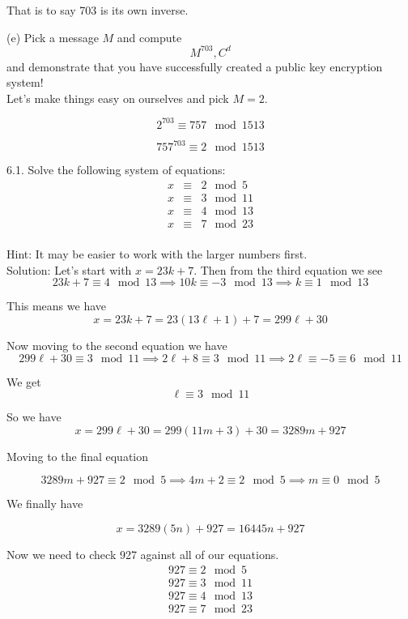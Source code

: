 \documentclass[16 pt]{amsart}
\theoremstyle{definition}
\theoremstyle{remark}
\numberwithin{equation}{subsection}
\begin{document}
That is to say 703 is its own inverse.


(e) Pick a message $M$ and compute
\[
M^{703}, C^d
\]
and demonstrate that you have successfully created a public key encryption system!\\


Let's make things easy on ourselves and pick $M=2$.

\[
2^{703} \equiv 757 \mod 1513
\]


\[
757^{703} \equiv 2 \mod 1513
\]

\newpage

6.1.  Solve the following system of equations:
\[
\begin{array}{ccc}
x & \equiv & 2 \mod 5\\
x & \equiv & 3 \mod 11\\
x & \equiv & 4 \mod 13\\
x & \equiv & 7 \mod 23\\
\end{array}
\]

Hint: It may be easier to work with the larger numbers first.\\



Solution:  Let's start with $x= 23k + 7$.  Then from the third equation we see
\[
23k + 7 \equiv 4 \mod 13 \implies 10k \equiv -3 \mod 13 \implies k \equiv 1 \mod 13
\]


This means we have
\[
x = 23k+7 = 23(13\ell + 1) + 7 = 299\ell +30
\]

Now moving to the second equation we have
\[
299\ell + 30 \equiv 3 \mod 11 \implies 2\ell + 8 \equiv 3 \mod 11 \implies 2\ell \equiv -5 \equiv 6 \mod 11
\]

We get
\[
\ell \equiv 3 \mod 11 
\]


So we have 
\[
x = 299\ell + 30 = 299(11m + 3)+30 = 3289 m + 927
\]



Moving to the final equation

\[
3289 m + 927 \equiv 2 \mod 5 \implies 4m + 2 \equiv 2 \mod 5 \implies m \equiv 0 \mod 5
\]


We finally have

\[
x = 3289(5n)+ 927 = 16445n + 927
\]


Now we need to check 927 against all of our equations.
\begin{eqnarray}
927 \equiv 2 \mod 5 \nonumber \\
927 \equiv 3 \mod 11 \nonumber \\
927 \equiv 4 \mod 13 \nonumber \\
927 \equiv 7 \mod 23 \nonumber 
\end{eqnarray}
\end{document}

